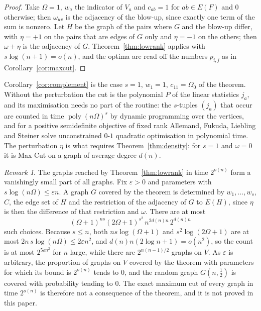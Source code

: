 \documentclass[11pt,reqno]{amsart}
\numberwithin{equation}{section}
\theoremstyle{plain}
\theoremstyle{definition}
\theoremstyle{remark}
\newtheorem{remark}[theorem]{Remark}
\DeclareMathOperator{\poly}{poly}
\begin{document}
\begin{proof}
Take $\Omega=1$, $w_a$ the indicator of $V_a$ and $c_{ab}=1$ for $ab\in E(F)$ and $0$
otherwise; then $\omega_{uv}$ is the adjacency of the blow-up, since exactly one
term of the sum is nonzero. Let $H$ be the graph of the pairs where $G$ and the
blow-up differ, with $\eta=+1$ on the pairs that are edges of $G$ only and $\eta=-1$ on
the others; then $\omega+\eta$ is the adjacency of $G$. Theorem~\ref{thm:lowrank} applies
with $s\log(n+1)=o(n)$, and the optima are read off the numbers $p_{i,j}$ as in
Corollary~\ref{cor:maxcut}.
\end{proof}

Corollary~\ref{cor:complement} is the case $s=1$, $w_1=1$, $c_{11}=\Omega_0$ of the
theorem. Without the perturbation the cut is the polynomial $P$ of the linear statistics
$j_a$, and its maximisation needs no part of the routine: the $s$-tuples $(j_a)$ that occur
are counted in time $\poly(n\Omega)^s$ by dynamic programming over the vertices, and
for a positive semidefinite objective of fixed rank Allemand, Fukuda, Liebling and
Steiner \cite{AFLS01} solve unconstrained $0$-$1$ quadratic optimisation in polynomial
time. The perturbation $\eta$ is what requires Theorem~\ref{thm:density}: for $s=1$ and
$\omega=0$ it is Max-Cut on a graph of average degree $d(n)$.

\begin{remark}\label{rem:lowrankcount}
The graphs reached by Theorem~\ref{thm:lowrank} in time $2^{o(n)}$ form a vanishingly
small part of all graphs. Fix $\varepsilon>0$ and parameters with
$s\log(n\Omega)\le\varepsilon n$. A graph $G$ covered by the theorem is determined by
$w_1,\dots,w_s$, $C$, the edge set of $H$ and the restriction of the adjacency of $G$ to
$E(H)$, since $\eta$ is then the difference of that restriction and $\omega$. There
are at most
\[
  (\Omega+1)^{ns}(2\Omega+1)^{s^2}\,n^{2d(n)n}\,2^{d(n)n}
\]
such choices. Because $s\le n$, both $ns\log(\Omega+1)$ and $s^2\log(2\Omega+1)$ are at
most $2n\,s\log(n\Omega)\le2\varepsilon n^2$, and $d(n)n(2\log n+1)=o(n^2)$, so the count
is at most $2^{5\varepsilon n^2}$ for $n$ large, while there are $2^{n(n-1)/2}$ graphs on
$V$. As $\varepsilon$ is arbitrary, the proportion of graphs on $V$ covered by the
theorem with parameters for which its bound is $2^{o(n)}$ tends to $0$, and the random
graph $G(n,\frac12)$ is covered with probability tending to $0$. The exact maximum cut
of every graph in time $2^{o(n)}$ is therefore not a consequence of the theorem, and it
is not proved in this paper.
\end{remark}
\end{document}
